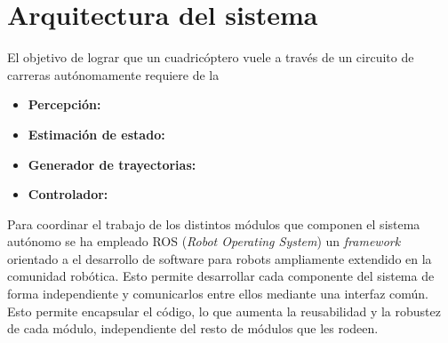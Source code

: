 \chapter{Arquitectura del sistema}


El objetivo de lograr que un cuadricóptero vuele a través de un circuito de carreras autónomamente requiere de la 

\begin{itemize}
	\item \textbf{Percepción:}
	\item \textbf{Estimación de estado:}
	\item \textbf{Generador de trayectorias:}
	\item \textbf{Controlador:}
\end{itemize}

Para coordinar el trabajo de los distintos módulos que componen el sistema autónomo se ha empleado ROS (\textit{Robot Operating System}) \cite{ros} un \textit{framework} orientado a el desarrollo de software para robots ampliamente extendido en la comunidad robótica. Esto permite desarrollar cada componente del sistema de forma independiente y comunicarlos entre ellos mediante una interfaz común. Esto permite encapsular el código, lo que aumenta la reusabilidad y la robustez de cada módulo, independiente del resto de módulos que les rodeen.


